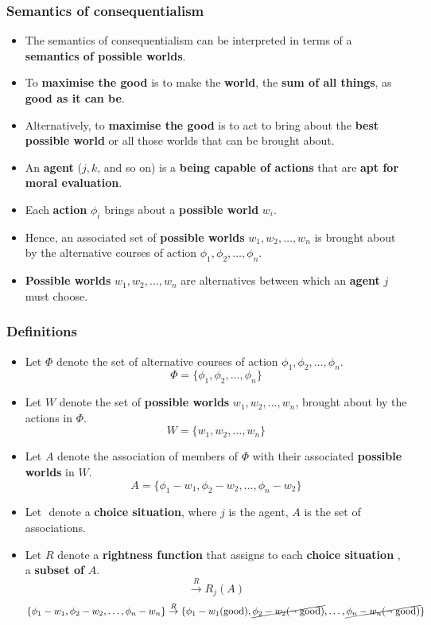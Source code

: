 \documentclass[11pt]{article}
\begin{document}
\subsubsection{Semantics of consequentialism}
\label{sec:orgcfebd9e}
\begin{itemize}
\item The semantics of consequentialism can be interpreted in terms of a \textbf{semantics of possible worlds}.
\item To \textbf{maximise the good} is to make the \textbf{world}, the \textbf{sum of all things}, as \textbf{good as it can be}.
\item Alternatively, to \textbf{maximise the good} is to act to bring about the \textbf{best possible world} or all those worlds that can be brought about.
\item An \textbf{agent} (\(j, k\), and so on) is a \textbf{being capable of actions} that are \textbf{apt for moral evaluation}.
\item Each \textbf{action} \(\phi_i\) brings about a \textbf{possible world} \(w_i\).
\item Hence, an associated set of \textbf{possible worlds} \(w_1, w_2, \ldots, w_n\) is brought about by the alternative courses of action \(\phi_1, \phi_2, \ldots, \phi_n\).
\item \textbf{Possible worlds} \(w_1, w_2, \ldots, w_n\) are alternatives between which an \textbf{agent} \(j\) must choose.
\end{itemize}
\subsubsection{Definitions}
\label{sec:org8eca6d3}
\begin{itemize}
\item Let \(\Phi\) denote the set of alternative courses of action \(\phi_1, \phi_2, \ldots, \phi_n\).
\[\Phi = \{\phi_1, \phi_2, \ldots, \phi_n\}\]
\item Let \(W\) denote the set of \textbf{possible worlds} \(w_1, w_2, \ldots, w_n\), brought about by the actions in \(\Phi\).
\[W = \{w_1, w_2, \ldots, w_n\}\]
\item Let \(A\) denote the association of members of \(\Phi\) with their associated \textbf{possible worlds} in \(W\).
\[A = \{\phi_1 - w_1, \phi_2 - w_2, \ldots, \phi_n - w_2\}\]
\item Let \(<j, A>\) denote a \textbf{choice situation}, where \(j\) is the agent, \(A\) is the set of associations.
\item Let \(R\) denote a \textbf{rightness function} that assigns to each \textbf{choice situation} \(<j, A>\), a \textbf{subset of} \(A\).
\[<j, A> \overset{R}{\rightarrow} R_j (A)\]
\[\{\phi_1 - w_1, \phi_2 - w_2, \ldots, \phi_n - w_n\} \overset{R}{\rightarrow} \{\phi_1 - w_1 (\text{good}), \cancel{\phi_2 - w_2 (\neg \text{ good})}, \ldots, \cancel{\phi_n - w_n (\neg \text{ good})}\}\]
\end{itemize}
\end{document}
